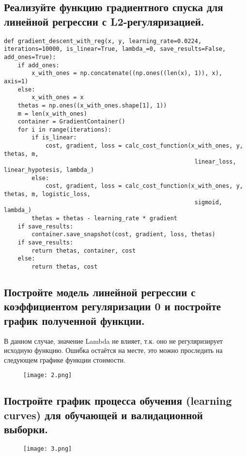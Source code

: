 \subsection{Реализуйте функцию градиентного спуска для линейной регрессии с L2-регуляризацией.}

\begin{lstlisting}
def gradient_descent_with_reg(x, y, learning_rate=0.0224, iterations=10000, is_linear=True, lambda_=0, save_results=False, add_ones=True):
    if add_ones:
        x_with_ones = np.concatenate((np.ones((len(x), 1)), x), axis=1)
    else:
        x_with_ones = x
    thetas = np.ones((x_with_ones.shape[1], 1))
    m = len(x_with_ones)
    container = GradientContainer()
    for i in range(iterations):
        if is_linear:
            cost, gradient, loss = calc_cost_function(x_with_ones, y, thetas, m,
                                                       linear_loss, linear_hypotesis, lambda_)
        else:
            cost, gradient, loss = calc_cost_function(x_with_ones, y, thetas, m, logistic_loss,
                                                       sigmoid, lambda_)
        thetas = thetas - learning_rate * gradient
    if save_results:
        container.save_snapshot(cost, gradient, loss, thetas)
    if save_results:
        return thetas, container, cost
    else:
        return thetas, cost
\end{lstlisting}

\subsection{Постройте модель линейной регрессии с коэффициентом регуляризации 0 и постройте график полученной функции.}

В данном случае, значение Lambda не влияет, т.к. оно не регуляризирует исходную функцию. Ошибка остаётся на месте, это можно проследить на следующем графике функции стоимости.

\begin{figure}[h]
\centering
	\texttt{[image: 2.png]}
	\label{sec:purpose:payings}
\end{figure}

\subsection{Постройте график процесса обучения (learning curves) для обучающей и валидационной выборки.}

\begin{figure}[h]
\centering
	\texttt{[image: 3.png]}
	\label{sec:purpose:payings}
\end{figure}

